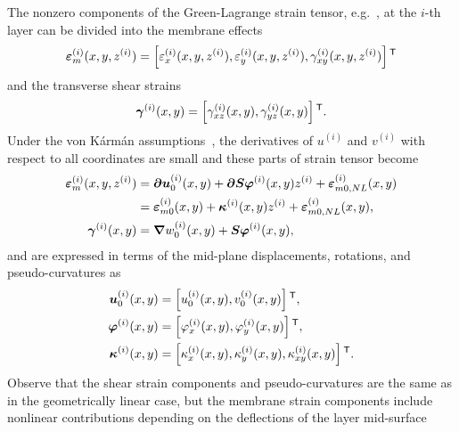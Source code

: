 \documentclass[11pt]{article}
\newcommand{\curv}{\kappa} \newcommand{\curvx}{\kappa_x}
\newcommand{\curvy}{\kappa_y}
\newcommand{\curvxy}{\kappa_{xy}}
\newcommand{\rot}{\varphi}
\newcommand{\strain}{\varepsilon}
\newcommand{\sstrain}{\gamma}
\newcommand{\m}{_m}
\newcommand{\mO}{_{m0}}
\newcommand{\mONL}{_{m0,NL}}
\newcommand{\layer}[1]{^{(#1)}}
\begin{document}
The nonzero components of the Green-Lagrange strain tensor, e.g.~\cite[Section~24.1]{Jirasek:2002:IAS}, at the $i$-th layer can be divided into the membrane effects 
\begin{equation}
\mtrx{\strain}\m\layer{i}(x,y,z\layer{i}) = \left[ \strain\layer{i}_{x} (x,y,z\layer{i}), \strain\layer{i}_{y} (x,y,z\layer{i}), \sstrain\layer{i}_{xy} (x,y,z\layer{i}) \right]\trn
\end{equation}
and the transverse shear strains 
\begin{equation}
\mtrx{\sstrain}\layer{i}(x,y) = \left[ \sstrain\layer{i}_{xz}(x,y), \sstrain\layer{i}_{yz}(x,y) \right]\trn.
\end{equation}
Under the von K\'{a}rm\'{a}n assumptions~\citep{Timoshenko:1959:TPS}, the derivatives of $u\layer{i}$ and $v\layer{i}$ with respect to all coordinates are small and  
these parts of strain tensor become
\begin{subequations}
\begin{align}
\mtrx{\strain}\m\layer{i}(x,y,z\layer{i}) 
& =  
\pard\mtrx{u}\layer{i}_0(x,y) + \pard\mtrx{S}\mtrx{\rot}\layer{i}(x,y) z\layer{i} + 
\mtrx{\strain}\mONL\layer{i}(x,y)\nonumber\\
& =
\mtrx{\strain}\mO\layer{i}(x,y) 
+
\mtrx{\curv}\layer{i}(x,y) z\layer{i}
+ 
\mtrx{\strain}\mONL\layer{i}(x,y),
\label{eq:generalized_strains_a}\\
\mtrx{\sstrain}\layer{i}(x,y) 
& = 
\mtrx{\nabla}w_0\layer{i}(x,y) 
+ 
\mtrx{S}
\mtrx{\rot}\layer{i}(x,y),
\label{eq:generalized_strains_b}
\end{align}
\label{eq:generalized_strains}
\end{subequations}
and are expressed in terms of the mid-plane displacements, rotations, and pseudo-curvatures as
\begin{subequations}
\begin{align}
\mtrx{u}\layer{i}_0(x,y) &= \left[{u}\layer{i}_0(x,y), {v}\layer{i}_0(x,y) \right]\trn,\\
\mtrx{\rot}\layer{i}(x,y) &= \left[\rot\layer{i}_x(x,y), \rot\layer{i}_y(x,y)\right]\trn,\\
\mtrx{\curv}\layer{i}(x,y) &= \left[ \curvx\layer{i}(x,y), \curvy\layer{i}(x,y), \curvxy\layer{i}(x,y) \right]\trn.
\end{align}
\end{subequations}
Observe that the shear strain components and pseudo-curvatures are the same as in the geometrically linear case, but the membrane strain components include nonlinear
contributions depending on the deflections of the layer mid-surface
\end{document}
